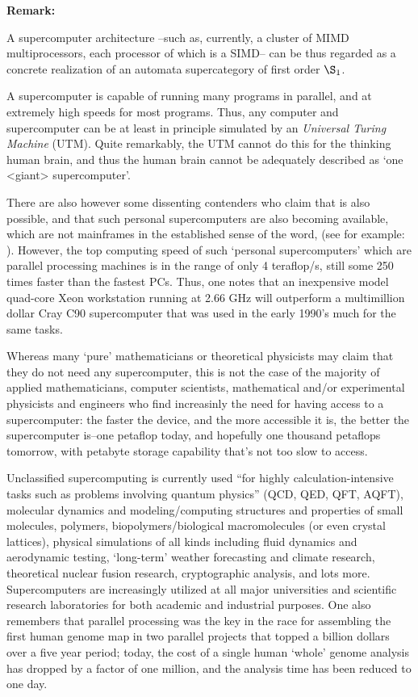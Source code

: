 \documentclass[12pt]{article}
\theoremstyle{plain}
\theoremstyle{definition}
\numberwithin{equation}{section}
\begin{document}
\textbf{Remark:}
  
 A supercomputer architecture --such as, currently, a cluster of MIMD multiprocessors, each processor of which is a SIMD-- can be thus regarded as a concrete realization of an automata supercategory of first order $\S_1$. 
 
  A supercomputer is capable of running many programs in parallel, and at extremely high speeds for most programs. Thus, any computer and supercomputer can be at least in principle simulated by an \emph{Universal Turing Machine} (UTM). Quite remarkably, the UTM cannot do this for the thinking human brain, and thus the human brain cannot be
adequately described as `one <giant> supercomputer'.
 
 There are also however some dissenting contenders who claim that  
is also possible, and that such personal supercomputers are also becoming available, which are not mainframes in the established sense of the word, (see for example: ). However, the top computing speed of such `personal supercomputers' which are parallel processing machines is in the range of only 4 teraflop/s, still some 250 times faster than the fastest PCs. 
Thus, one notes that an inexpensive model quad-core Xeon workstation running at 2.66 GHz will outperform a multimillion dollar Cray C90 supercomputer that was used in the early 1990's much for the same tasks. 

 Whereas many `pure' mathematicians or theoretical physicists may claim that 
they do not need any supercomputer, this is not the case of the majority of applied mathematicians, computer scientists, mathematical and/or experimental physicists and engineers who find increasinly the need for having access to a supercomputer: the faster the device, and the more accessible it is, the better the supercomputer is--one petaflop today, and hopefully one thousand petaflops tomorrow, with petabyte storage capability that's not too slow to access.

 Unclassified supercomputing is currently used ``for highly calculation-intensive tasks such as problems involving quantum physics'' (QCD, QED, QFT, AQFT), molecular dynamics and modeling/computing structures and properties of small 
molecules, polymers, biopolymers/biological macromolecules (or even crystal lattices), physical simulations of all kinds
including fluid dynamics and aerodynamic testing, `long-term' weather forecasting and climate research,  theoretical nuclear fusion research, cryptographic analysis, and lots more. Supercomputers are increasingly utilized at all major universities and scientific research laboratories for both academic and industrial purposes.
One also remembers that parallel processing was the key in the race for assembling the first human genome
map in two parallel projects that topped a billion dollars over a five year period; today, the cost of a single human `whole' genome analysis has dropped by a factor of one million, and the analysis time has been reduced to one day.  

\end{document}
